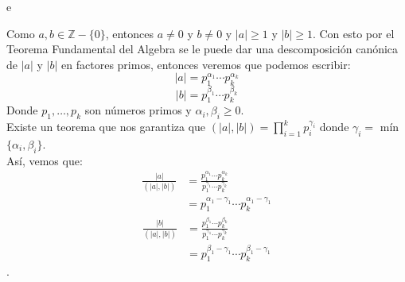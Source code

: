 e\documentclass[fontsize=12pt]{scrartcl}
\providecommand{\abs}[1]{\lvert#1\rvert}
\begin{document}
\begin{enumerate}
                  Como  $a, b \in \mathbb{Z}-\{0\}$, entonces $a \neq 0$ y $b \neq 0$ y $\abs{a} \geq 1$ y $\abs{b} \geq 1$. Con esto por el Teorema Fundamental del Algebra se le puede dar una descomposición canónica de $ \abs{a}$ y $\abs{b}$ en factores primos, entonces veremos que podemos escribir: \\
                  \[ \abs{a} = p_1^{\alpha_1} \cdots p_k^{\alpha_k} \]
                  \[ \abs{b} = p_1^{\beta_1} \cdots p_k^{\beta_k} \]
                  Donde $p_1, \dots ,p_k$ son números primos y $\alpha_i, \beta_i \geq 0$. \\

                  Existe un teorema que nos garantiza que $(\abs{a},\abs{b}) = \prod_{i=1}^{k} p_i ^{\gamma_i} $ donde $\gamma_i =$ mín$\{\alpha_i, \beta_i\}$. \\
                  Así, vemos que:
                   \begin{equation*}
                    \begin{split}
                      \frac{\abs {a} } {(\abs{a},\abs{b})} &= \frac{ p_1^{\alpha_1} \cdots p_k^{\alpha_k} } {p_1^{\gamma_1} \cdots p_k^{\gamma_k}}\\
                      &= p_1^{\alpha_1 - \gamma_1} \cdots p_k^{\alpha_1 - \gamma_1}
                    \end{split}
                  \end{equation*}
                    \begin{equation*}
                    \begin{split}
                      \frac{\abs {b} } {(\abs{a},\abs{b})} &= \frac{ p_1^{\beta_1} \cdots p_k^{\beta_k} } {p_1^{\gamma_1} \cdots p_k^{\gamma_k}}\\
                      &= p_1^{\beta_1 - \gamma_1} \cdots p_k^{\beta_1 - \gamma_1}
                    \end{split}
                    \end{equation*}.



\end{enumerate}
\end{document}
